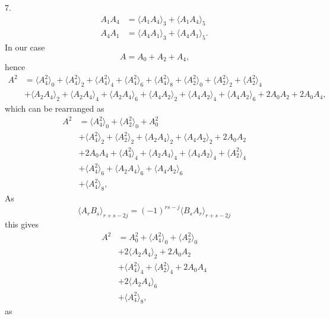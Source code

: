 \documentclass[aps, preprint]{revtex4}
\begin{document}
7.
\begin{align}A_{1} A_{4} &  = \langle A_{1} A_{4} \rangle _{3} + \langle A_{1} A_{4} \rangle _{5} \\
A_{4} A_{1} &  = \langle A_{4} A_{1} \rangle _{3} + \langle A_{4} A_{1} \rangle _{5}\text{.}\end{align}In our case
\begin{equation}A =A_{0} +A_{2} +A_{4}\text{,}
\end{equation}hence
\begin{align}A^{2} &  = \langle A_{4}^{2} \rangle _{0} + \langle A_{4}^{2} \rangle _{2} + \langle A_{4}^{2} \rangle _{4} + \langle A_{4}^{2} \rangle _{6} + \langle A_{4}^{2} \rangle _{8} + \langle A_{2}^{2} \rangle _{0} + \langle A_{2}^{2} \rangle _{2} + \langle A_{2}^{2} \rangle _{4} \nonumber  \\
 &  + \langle A_{2} A_{4} \rangle _{2} + \langle A_{2} A_{4} \rangle _{4} + \langle A_{2} A_{4} \rangle _{6} + \langle A_{4} A_{2} \rangle _{2} + \langle A_{4} A_{2} \rangle _{4} + \langle A_{4} A_{2} \rangle _{6} +2 A_{0} A_{2} +2 A_{0} A_{4}\text{,}\end{align}which can be rearranged as
\begin{align}A^{2} &  = \langle A_{4}^{2} \rangle _{0} + \langle A_{2}^{2} \rangle _{0} +A_{0}^{2} \nonumber  \\
 &  + \langle A_{4}^{2} \rangle _{2} + \langle A_{2}^{2} \rangle _{2} + \langle A_{2} A_{4} \rangle _{2} + \langle A_{4} A_{2} \rangle _{2} +2 A_{0} A_{2} \nonumber  \\
 &  +2 A_{0} A_{4} + \langle A_{4}^{2} \rangle _{4} + \langle A_{2} A_{4} \rangle _{4} + \langle A_{4} A_{2} \rangle _{4} + \langle A_{2}^{2} \rangle _{4} \nonumber  \\
 &  + \langle A_{4}^{2} \rangle _{6} + \langle A_{2} A_{4} \rangle _{6} + \langle A_{4} A_{2} \rangle _{6} \nonumber  \\
 &  + \langle A_{4}^{2} \rangle _{8}\text{,}\end{align}As
\begin{equation} \langle A_{r} B_{s} \rangle _{r +s -2 j} =\left ( -1\right )^{r s -j}  \langle B_{s} A_{r} \rangle _{r +s -2 j}
\end{equation}this gives
\begin{align}A^{2} &  =A_{0}^{2} + \langle A_{4}^{2} \rangle _{0} + \langle A_{2}^{2} \rangle _{0} \nonumber  \\
 &  +2  \langle A_{2} A_{4} \rangle _{2} +2 A_{0} A_{2} \nonumber  \\
 &  + \langle A_{4}^{2} \rangle _{4} + \langle A_{2}^{2} \rangle _{4} +2 A_{0} A_{4} \nonumber  \\
 &  +2  \langle A_{2} A_{4} \rangle _{6} \nonumber  \\
 &  + \langle A_{4}^{2} \rangle _{8}\text{,}\end{align}as
\end{document}
